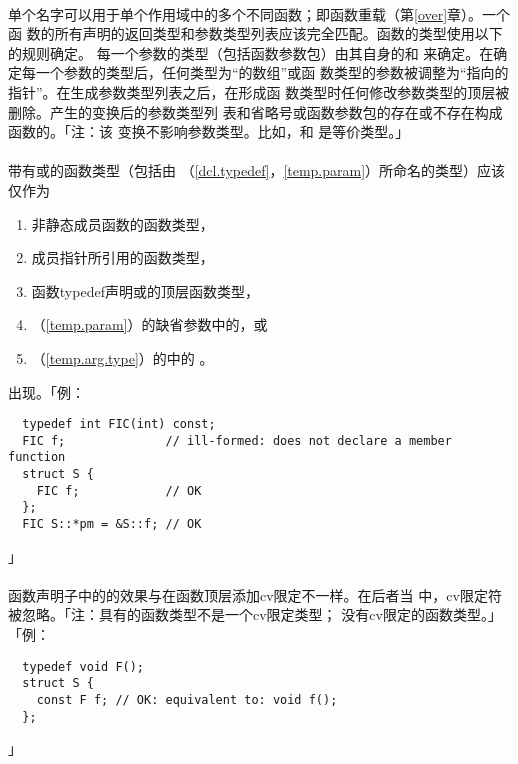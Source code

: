 \paragraph{}
单个名字可以用于单个作用域中的多个不同函数；即函数重载（第\ref{over}章）。一个函
数的所有声明的返回类型和参数类型列表应该完全匹配。函数的类型使用以下的规则确定。
每一个参数的类型（包括函数参数包）由其自身的和
来确定。在确定每一个参数的类型后，任何类型为``的数组''或函
数类型的参数被调整为``指向的指针''。在生成参数类型列表之后，在形成函
数类型时任何修改参数类型的顶层被删除。产生的变换后的参数类型列
表和省略号或函数参数包的存在或不存在构成函数的。「注：该
变换不影响参数类型。比如，和
是等价类型。」

\paragraph{}
带有或的函数类型（包括由
（\ref{dcl.typedef}，\ref{temp.param}）所命名的类型）应该仅作为
\begin{enumerate}
  \item{非静态成员函数的函数类型，}
  \item{成员指针所引用的函数类型，}
  \item{函数typedef声明或的顶层函数类型，}
  \item{（\ref{temp.param}）的缺省参数中的，或}
  \item{（\ref{temp.arg.type}）的中的
    。}
\end{enumerate}
出现。「例：
\begin{lstlisting}
  typedef int FIC(int) const;
  FIC f;              // ill-formed: does not declare a member function
  struct S {
    FIC f;            // OK
  };
  FIC S::*pm = &S::f; // OK
\end{lstlisting}」

\paragraph{}
函数声明子中的的效果与在函数顶层添加cv限定不一样。在后者当
中，cv限定符被忽略。「注：具有的函数类型不是一个cv限定类型；
没有cv限定的函数类型。」「例：
\begin{lstlisting}
  typedef void F();
  struct S {
    const F f; // OK: equivalent to: void f();
  };
\end{lstlisting}」

